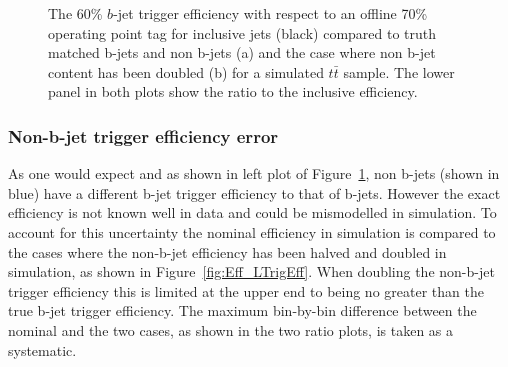\begin{figure}[!ht]
\begin{center}
  \end{center}
  \caption{The 60\% $b$-jet trigger efficiency with respect to an offline 70\% operating point tag
    for inclusive jets (black) compared to truth matched b-jets and non b-jets (a) and the case where non b-jet content has been doubled (b) for a simulated $t\bar{t}$ sample.
    The lower panel in both plots show the ratio to the inclusive efficiency.
  }
  \label{fig:Eff_Purity}
\end{figure}

\subsubsection{Non-b-jet trigger efficiency error}
\label{sec:trig-lightTrigEff}

As one would expect and as shown in left plot of Figure~\ref{fig:Eff_Purity}, non b-jets (shown in blue) have a different b-jet trigger efficiency to that of b-jets.
However the exact efficiency is not known well in data and could be mismodelled in simulation.
To account for this uncertainty the nominal efficiency in simulation is compared
to the cases where the non-b-jet efficiency has been halved and doubled in simulation, as shown in Figure~\ref{fig:Eff_LTrigEff}.
When doubling the non-b-jet trigger efficiency this is limited at the upper end to being no greater than the true b-jet trigger efficiency.
The maximum bin-by-bin difference between the nominal and the two cases, as shown in the two ratio plots, is taken as a systematic.

